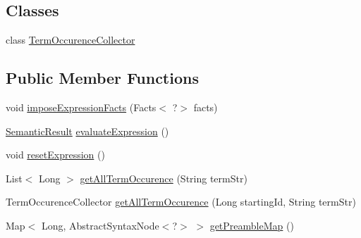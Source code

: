 \subsection*{Classes}
\begin{DoxyCompactItemize}
\item 
class \hyperlink{classit_1_1emarolab_1_1cagg_1_1core_1_1evaluation_1_1semanticGrammar_1_1syntaxCompiler_1_1Gramma8ae8fecdc099d4114647279a9237b701}{Term\-Occurence\-Collector}
\end{DoxyCompactItemize}
\subsection*{Public Member Functions}
\begin{DoxyCompactItemize}
\item 
void \hyperlink{classit_1_1emarolab_1_1cagg_1_1core_1_1evaluation_1_1semanticGrammar_1_1syntaxCompiler_1_1Grammac6e795d7438edf939adda9d5323937f2_a6052e399d6496a5804c753f3aaaa32ff}{impose\-Expression\-Facts} (Facts$<$ ?$>$ facts)
\item 
\hyperlink{classit_1_1emarolab_1_1cagg_1_1core_1_1evaluation_1_1semanticGrammar_1_1syntaxCompiler_1_1Semant5d395032261986aec1b33357dd21b6bb}{Semantic\-Result} \hyperlink{classit_1_1emarolab_1_1cagg_1_1core_1_1evaluation_1_1semanticGrammar_1_1syntaxCompiler_1_1Grammac6e795d7438edf939adda9d5323937f2_a609d620b79500e6824147e52b18534d6}{evaluate\-Expression} ()
\item 
void \hyperlink{classit_1_1emarolab_1_1cagg_1_1core_1_1evaluation_1_1semanticGrammar_1_1syntaxCompiler_1_1Grammac6e795d7438edf939adda9d5323937f2_a4a839aa0f3404951f86c624e9c78e60c}{reset\-Expression} ()
\item 
List$<$ Long $>$ \hyperlink{classit_1_1emarolab_1_1cagg_1_1core_1_1evaluation_1_1semanticGrammar_1_1syntaxCompiler_1_1Grammac6e795d7438edf939adda9d5323937f2_a3ec383ee521b7dcf932f01accace3244}{get\-All\-Term\-Occurence} (String term\-Str)
\item 
Term\-Occurence\-Collector \hyperlink{classit_1_1emarolab_1_1cagg_1_1core_1_1evaluation_1_1semanticGrammar_1_1syntaxCompiler_1_1Grammac6e795d7438edf939adda9d5323937f2_aafda65159a7d98070d71a95ec39c13c4}{get\-All\-Term\-Occurence} (Long starting\-Id, String term\-Str)
\item 
Map$<$ Long, Abstract\-Syntax\-Node$<$?$>$ $>$ \hyperlink{classit_1_1emarolab_1_1cagg_1_1core_1_1evaluation_1_1semanticGrammar_1_1syntaxCompiler_1_1Grammac6e795d7438edf939adda9d5323937f2_a8363c7e05455a985bb600883003a537a}{get\-Preamble\-Map} ()

\end{DoxyCompactItemize}
